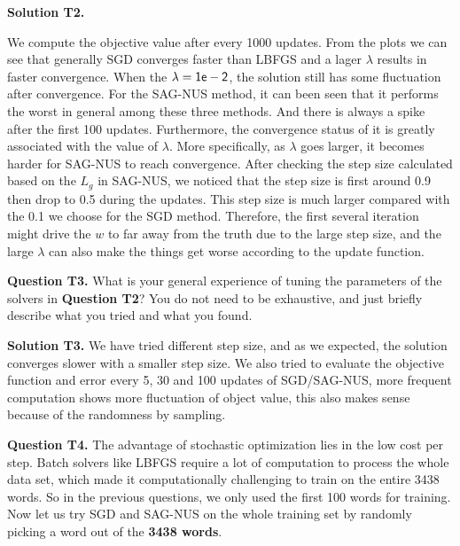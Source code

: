 \documentclass[11pt]{report}
\begin{document}

{\bf Solution T2.}

We compute the objective value after every 1000 updates. From the plots we can see that generally SGD converges faster than LBFGS and a lager $\lambda$ results in faster convergence. When the $\lambda = {\sf 1e-2}$, the solution still has some fluctuation after convergence. For the SAG-NUS method, it can been seen that it performs the worst in general among these three methods. And there is always a spike after the first 100 updates. Furthermore, the convergence status of it is greatly associated with the value of $\lambda$. More specifically, as $\lambda$ goes larger, it becomes harder for SAG-NUS to reach convergence. After checking the step size calculated based on the $L_g$ in SAG-NUS, we noticed that the step size is first around 0.9 then drop to 0.5 during the updates. This step size is much larger compared with the 0.1 we choose for the SGD method. Therefore, the first several iteration might drive the $w$ to far away from the truth due to the large step size, and the large $\lambda$ can also make the things get worse according to the update function. 



{\bf Question T3.}
What is your general experience of tuning the parameters of the solvers in {\bf Question T2}?
You do not need to be exhaustive, and just briefly describe what you tried and what you found.

{\bf Solution T3.}
We have tried different step size, and as we expected, the solution converges slower with a smaller step size.
We also tried to evaluate the objective function and error every 5, 30 and 100 updates of SGD/SAG-NUS, more frequent computation shows more fluctuation of object value, this also makes sense because of the randomness by sampling.

{\bf Question T4.}
The advantage of stochastic optimization lies in the low cost per step.
Batch solvers like LBFGS require a lot of computation to process the whole data set,
which made it computationally challenging to train on the entire 3438 words.
So in the previous questions, we only used the first 100 words for training.
Now let us try SGD and SAG-NUS on the whole training set by randomly picking a word out of the {\bf 3438 words}.
\end{document}

